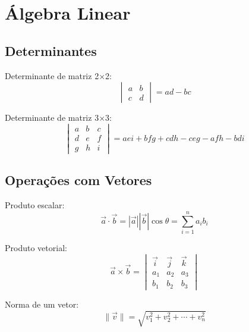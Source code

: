 
\section{Álgebra Linear}

\subsection{Determinantes}

Determinante de matriz 2×2:
\begin{equation}
\begin{vmatrix}
a & b \\
c & d
\end{vmatrix} = ad - bc
\end{equation}

Determinante de matriz 3×3:
\begin{equation}
\begin{vmatrix}
a & b & c \\
d & e & f \\
g & h & i
\end{vmatrix} = aei + bfg + cdh - ceg - afh - bdi
\end{equation}

\subsection{Operações com Vetores}

Produto escalar:
\begin{equation}
\vec{a} \cdot \vec{b} = |\vec{a}||\vec{b}|\cos\theta = \sum_{i=1}^{n} a_i b_i
\end{equation}

Produto vetorial:
\begin{equation}
\vec{a} \times \vec{b} = \begin{vmatrix}
\vec{i} & \vec{j} & \vec{k} \\
a_1 & a_2 & a_3 \\
b_1 & b_2 & b_3
\end{vmatrix}
\end{equation}

Norma de um vetor:
\begin{equation}
\|\vec{v}\| = \sqrt{v_1^2 + v_2^2 + \cdots + v_n^2}
\end{equation}


